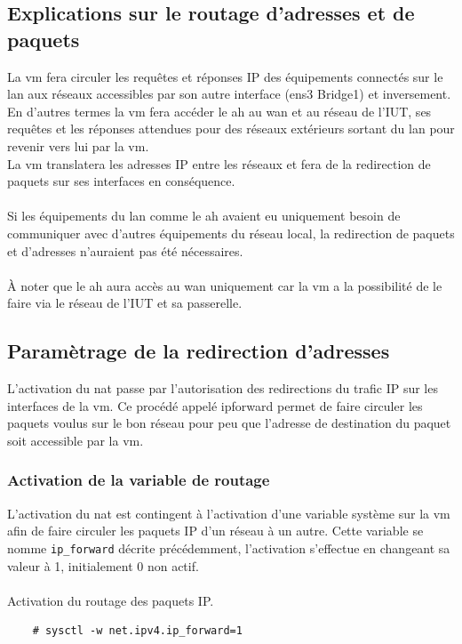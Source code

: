\documentclass[a4paper]{article}
\begin{document}
\subsection{Explications sur le routage d'adresses et de paquets}
La \acrshort{vm} fera circuler les requêtes et réponses IP des équipements connectés sur le \gls{lan} aux réseaux accessibles par son autre interface (ens3 Bridge1) et inversement. En d'autres termes la \acrshort{vm} fera accéder le \acrshort{ah} au \gls{wan} et au réseau de l'IUT, ses requêtes et les réponses attendues pour des réseaux extérieurs sortant du \gls{lan} pour revenir vers lui par la \acrshort{vm}.\\La \acrshort{vm} translatera les adresses IP entre les réseaux et fera de la redirection de paquets sur ses interfaces en conséquence.\\\\Si les équipements du \gls{lan} comme le \acrshort{ah} avaient eu uniquement besoin de communiquer avec d'autres équipements du réseau local, la redirection de paquets et d'adresses n'auraient pas été nécessaires.\\\\À noter que le \acrshort{ah} aura accès au \gls{wan} uniquement car la \acrshort{vm} a la possibilité de le faire via le réseau de l'IUT et sa passerelle.
\subsection{Paramètrage de la redirection d'adresses}
L'activation du \gls{nat} passe par l'autorisation des redirections du trafic IP sur les interfaces de la \acrshort{vm}. Ce procédé appelé \gls{ipforward} permet de faire circuler les paquets voulus sur le bon réseau pour peu que l'adresse de destination du paquet soit accessible par la \acrshort{vm}.
\subsubsection{Activation de la variable de routage}
L'activation du \gls{nat} est contingent à l'activation d'une variable système sur la \acrshort{vm} afin de faire circuler les paquets IP d'un réseau à un autre. Cette variable se nomme \verb|ip_forward| décrite précédemment, l'activation s'effectue en changeant sa valeur à 1, initialement 0 non actif.\\\\Activation du routage des paquets IP.
\begin{lstlisting}
    # sysctl -w net.ipv4.ip_forward=1
\end{lstlisting}
\end{document}
